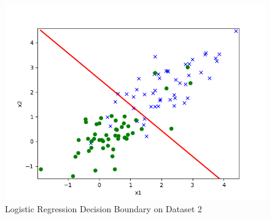 \documentclass[11pt]{article}
\begin{document}
	\begin{figure}[h]
		\centering
		\includegraphics[width=0.6\linewidth]{src/linearclass/logreg_pred_2.png}
		\caption{Logistic Regression Decision Boundary on Dataset 2}
	\end{figure}
	
	
	\newpage
\end{document}
